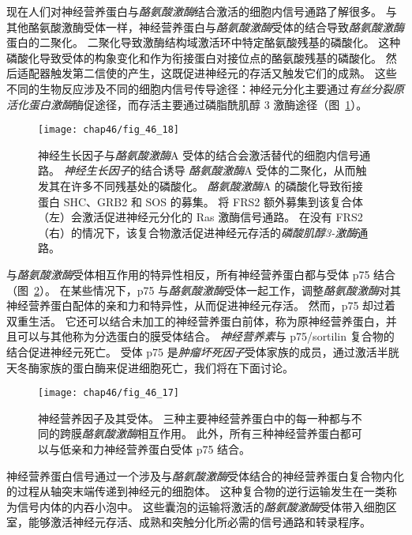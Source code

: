 现在人们对神经营养蛋白与\textit{酪氨酸激酶}结合激活的细胞内信号通路了解很多。
与其他酪氨酸激酶受体一样，神经营养蛋白与\textit{酪氨酸激酶}受体的结合导致\textit{酪氨酸激酶}蛋白的二聚化。
二聚化导致激酶结构域激活环中特定酪氨酸残基的磷酸化。
这种磷酸化导致受体的构象变化和作为衔接蛋白对接位点的酪氨酸残基的磷酸化。
然后适配器触发第二信使的产生，这既促进神经元的存活又触发它们的成熟。
这些不同的生物反应涉及不同的细胞内信号传导途径：神经元分化主要通过\textit{有丝分裂原活化蛋白激酶}酶促途径，而存活主要通过磷脂酰肌醇 3 激酶途径（图~\ref{fig:46_18}）。


\begin{figure}[htbp]
	\centering
	\texttt{[image: chap46/fig\_46\_18]}
	\caption{神经生长因子与\textit{酪氨酸激酶}A 受体的结合会激活替代的细胞内信号通路。
		\textit{神经生长因子}的结合诱导 \textit{酪氨酸激酶}A 受体的二聚化，从而触发其在许多不同残基处的磷酸化。
		\textit{酪氨酸激酶}A 的磷酸化导致衔接蛋白 SHC、GRB2 和 SOS 的募集。
		将 FRS2 额外募集到该复合体（左）会激活促进神经元分化的 Ras 激酶信号通路。
		在没有 FRS2（右）的情况下，该复合物激活促进神经元存活的\textit{磷酸肌醇3-激酶}通路。}
	\label{fig:46_18}
\end{figure}


与\textit{酪氨酸激酶}受体相互作用的特异性相反，所有神经营养蛋白都与受体 p75 结合（图~\ref{fig:46_17}）。
在某些情况下，p75 与\textit{酪氨酸激酶}受体一起工作，调整\textit{酪氨酸激酶}对其神经营养蛋白配体的亲和力和特异性，从而促进神经元存活。
然而，p75 却过着双重生活。
它还可以结合未加工的神经营养蛋白前体，称为原神经营养蛋白，并且可以与其他称为分选蛋白的膜受体结合。
\textit{神经营养素}与 p75/sortilin 复合物的结合促进神经元死亡。
受体 p75 是\textit{肿瘤坏死因子}受体家族的成员，通过激活半胱天冬酶家族的蛋白酶来促进细胞死亡，我们将在下面讨论。


\begin{figure}[htbp]
	\centering
	\texttt{[image: chap46/fig\_46\_17]}
	\caption{神经营养因子及其受体。
		三种主要神经营养蛋白中的每一种都与不同的跨膜\textit{酪氨酸激酶}相互作用。
		此外，所有三种神经营养蛋白都可以与低亲和力神经营养蛋白受体 p75 结合\cite{reichardt1997neurotrophic}。}
	\label{fig:46_17}
\end{figure}


神经营养蛋白信号通过一个涉及与\textit{酪氨酸激酶}受体结合的神经营养蛋白复合物内化的过程从轴突末端传递到神经元的细胞体。
这种复合物的逆行运输发生在一类称为信号内体的内吞小泡中。
这些囊泡的运输将激活的\textit{酪氨酸激酶}受体带入细胞区室，能够激活神经元存活、成熟和突触分化所必需的信号通路和转录程序。


